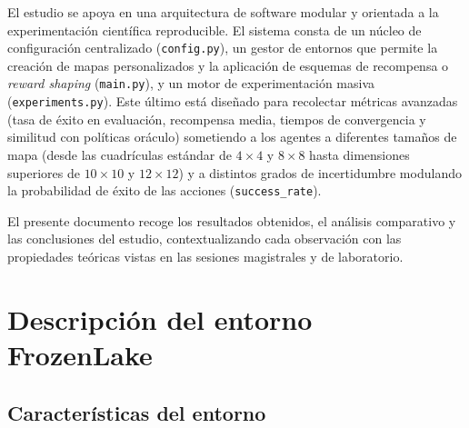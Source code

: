 \documentclass[11pt,a4paper]{article}
\begin{document}
El estudio se apoya en una arquitectura de software modular y orientada a la experimentación científica reproducible. El sistema consta de un núcleo de configuración centralizado (\texttt{config.py}), un gestor de entornos que permite la creación de mapas personalizados y la aplicación de esquemas de recompensa o \emph{reward shaping} (\texttt{main.py}), y un motor de experimentación masiva (\texttt{experiments.py}). Este último está diseñado para recolectar métricas avanzadas (tasa de éxito en evaluación, recompensa media, tiempos de convergencia y similitud con políticas oráculo) sometiendo a los agentes a diferentes tamaños de mapa (desde las cuadrículas estándar de $4\times 4$ y $8\times 8$ hasta dimensiones superiores de $10\times 10$ y $12\times 12$) y a distintos grados de incertidumbre modulando la probabilidad de éxito de las acciones (\texttt{success\_rate}).

El presente documento recoge los resultados obtenidos, el análisis comparativo y las conclusiones del estudio, contextualizando cada observación con las propiedades teóricas vistas en las sesiones magistrales y de laboratorio.

\section{Descripción del entorno FrozenLake}

\subsection{Características del entorno}
\end{document}
